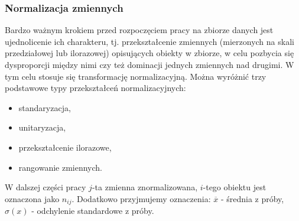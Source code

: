 \documentclass[12pt,a4paper]{report}
\begin{document}
\subsubsection{Normalizacja zmiennych}
Bardzo ważnym krokiem przed rozpoczęciem pracy na zbiorze danych jest ujednolicenie ich charakteru, tj. przekształcenie zmiennych (mierzonych na skali przedziałowej lub ilorazowej) opisujących obiekty w zbiorze, w celu pozbycia się dysproporcji między nimi czy też dominacji jednych zmiennych nad drugimi. W tym celu stosuje się transformację normalizacyjną. Można wyróżnić trzy podstawowe typy przekształceń normalizacyjnych:
\begin{itemize}
\item standaryzacja,
\item unitaryzacja,
\item przekształcenie ilorazowe,
\item rangowanie zmiennych.
\end{itemize}
W dalszej części pracy $j$-ta zmienna znormalizowana, $i$-tego obiektu jest oznaczona jako $n_{ij}$. Dodatkowo przyjmujemy oznaczenia: $\overline{x}$ - średnia z próby, $\sigma{(x)}$ - odchylenie standardowe z próby.
\end{document}
